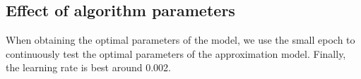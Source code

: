\documentclass[10pt,twocolumn,letterpaper]{article}
\begin{document}
\begin{table}
  \center
  \caption{}
  \label{table:performance}
  \end{table}
  
  \subsection{Effect of algorithm parameters}
  When obtaining the optimal parameters of the model,
 we use the small epoch to continuously test the optimal parameters of the approximation model. 
 Finally, the learning rate is best around 0.002.
\end{document}
